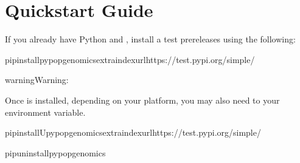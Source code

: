 \documentclass[letterpaper,10pt,english,openany,oneside]{sphinxmanual}
\begin{document}
\section{Quickstart Guide}
\label{\detokenize{docs/guide-chapter-install:quickstart-guide}}
\sphinxAtStartPar
{} 

\sphinxAtStartPar
If you already have Python and  {\hyperref[\detokenize{docs/guide-chapter-install:install-python-3-and-pip}]{}}, install a test pre\sphinxhyphen{}releases using the following:

\begin{sphinxVerbatim}[commandchars=\\\{\}]
pipinstallpypop\PYGZhy{}genomics\PYGZhy{}\PYGZhy{}extra\PYGZhy{}index\PYGZhy{}urlhttps://test.pypi.org/simple/
\end{sphinxVerbatim}

\begin{sphinxadmonition}{warning}{Warning:}
\sphinxAtStartPar
{}
\end{sphinxadmonition}

\sphinxAtStartPar
Once  is installed, depending on your platform, you may also
need to {\hyperref[\detokenize{docs/guide-chapter-install:post-install-path-adjustments}]{}} your 
environment variable.

\sphinxAtStartPar
{} 

\begin{sphinxVerbatim}[commandchars=\\\{\}]
pipinstall\PYGZhy{}Upypop\PYGZhy{}genomics\PYGZhy{}\PYGZhy{}extra\PYGZhy{}index\PYGZhy{}urlhttps://test.pypi.org/simple/
\end{sphinxVerbatim}

\sphinxAtStartPar
{} 

\begin{sphinxVerbatim}[commandchars=\\\{\}]
pipuninstallpypop\PYGZhy{}genomics
\end{sphinxVerbatim}
\end{document}
